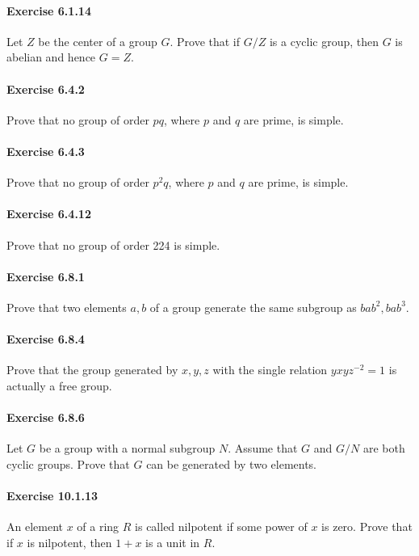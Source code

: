 \documentclass{article}
\begin{document}
\paragraph{Exercise 6.1.14} Let $Z$ be the center of a group $G$. Prove that if $G / Z$ is a cyclic group, then $G$ is abelian and hence $G=Z$.


\paragraph{Exercise 6.4.2} Prove that no group of order $p q$, where $p$ and $q$ are prime, is simple.


\paragraph{Exercise 6.4.3} Prove that no group of order $p^2 q$, where $p$ and $q$ are prime, is simple.


\paragraph{Exercise 6.4.12} Prove that no group of order 224 is simple.


\paragraph{Exercise 6.8.1} Prove that two elements $a, b$ of a group generate the same subgroup as $b a b^2, b a b^3$.


\paragraph{Exercise 6.8.4} Prove that the group generated by $x, y, z$ with the single relation $y x y z^{-2}=1$ is actually a free group.


\paragraph{Exercise 6.8.6} Let $G$ be a group with a normal subgroup $N$. Assume that $G$ and $G / N$ are both cyclic groups. Prove that $G$ can be generated by two elements.


\paragraph{Exercise 10.1.13} An element $x$ of a ring $R$ is called nilpotent if some power of $x$ is zero. Prove that if $x$ is nilpotent, then $1+x$ is a unit in $R$.
\end{document}
